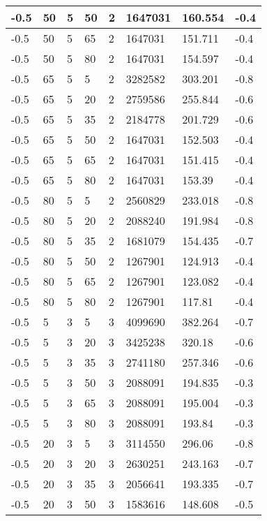 \begin{longtable}{|p{1.4cm}|p{1.4cm}|p{1.4cm}|p{1.4cm}|p{1.4cm}|p{1.4cm}|p{1.4cm}|p{1.5cm}|}
        -0.5 & 50 & 5 & 50 & 2 & 1647031 & 160.554 & -0.4 \\ \hline
        -0.5 & 50 & 5 & 65 & 2 & 1647031 & 151.711 & -0.4 \\ \hline
        -0.5 & 50 & 5 & 80 & 2 & 1647031 & 154.597 & -0.4 \\ \hline
        -0.5 & 65 & 5 & 5 & 2 & 3282582 & 303.201 & -0.8 \\ \hline
        -0.5 & 65 & 5 & 20 & 2 & 2759586 & 255.844 & -0.6 \\ \hline
        -0.5 & 65 & 5 & 35 & 2 & 2184778 & 201.729 & -0.6 \\ \hline
        -0.5 & 65 & 5 & 50 & 2 & 1647031 & 152.503 & -0.4 \\ \hline
        -0.5 & 65 & 5 & 65 & 2 & 1647031 & 151.415 & -0.4 \\ \hline
        -0.5 & 65 & 5 & 80 & 2 & 1647031 & 153.39 & -0.4 \\ \hline
        -0.5 & 80 & 5 & 5 & 2 & 2560829 & 233.018 & -0.8 \\ \hline
        -0.5 & 80 & 5 & 20 & 2 & 2088240 & 191.984 & -0.8 \\ \hline
        -0.5 & 80 & 5 & 35 & 2 & 1681079 & 154.435 & -0.7 \\ \hline
        -0.5 & 80 & 5 & 50 & 2 & 1267901 & 124.913 & -0.4 \\ \hline
        -0.5 & 80 & 5 & 65 & 2 & 1267901 & 123.082 & -0.4 \\ \hline
        -0.5 & 80 & 5 & 80 & 2 & 1267901 & 117.81 & -0.4 \\ \hline
        -0.5 & 5 & 3 & 5 & 3 & 4099690 & 382.264 & -0.7 \\ \hline
        -0.5 & 5 & 3 & 20 & 3 & 3425238 & 320.18 & -0.6 \\ \hline
        -0.5 & 5 & 3 & 35 & 3 & 2741180 & 257.346 & -0.6 \\ \hline
        -0.5 & 5 & 3 & 50 & 3 & 2088091 & 194.835 & -0.3 \\ \hline
        -0.5 & 5 & 3 & 65 & 3 & 2088091 & 195.004 & -0.3 \\ \hline
        -0.5 & 5 & 3 & 80 & 3 & 2088091 & 193.84 & -0.3 \\ \hline
        -0.5 & 20 & 3 & 5 & 3 & 3114550 & 296.06 & -0.8 \\ \hline
        -0.5 & 20 & 3 & 20 & 3 & 2630251 & 243.163 & -0.7 \\ \hline
        -0.5 & 20 & 3 & 35 & 3 & 2056641 & 193.335 & -0.7 \\ \hline
        -0.5 & 20 & 3 & 50 & 3 & 1583616 & 148.608 & -0.5 \\ \hline

\end{longtable}
